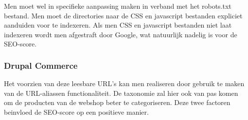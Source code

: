 Men moet wel in specifieke aanpassing maken in verband met het robots.txt bestand. Men moet de directories naar de CSS en javascript bestanden expliciet aanduiden voor te indexeren. Als men CSS en javascript bestanden niet laat indexeren wordt men afgestraft door Google, wat natuurlijk nadelig is voor de SEO-score.

\subsubsection{Drupal Commerce}
Het voorzien van deze leesbare URL's kan men realiseren door gebruik te maken van de URL-aliassen functionaliteit. De taxonomie zal hier ook van pas komen om de producten van de webshop beter te categoriseren. Deze twee factoren beinvloed de SEO-score op een positieve manier.
